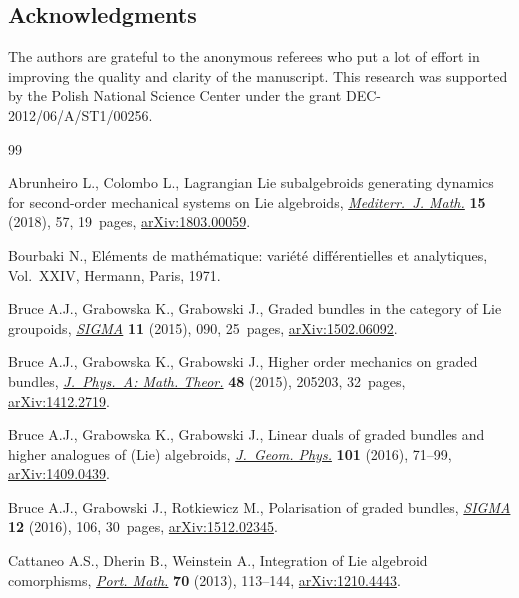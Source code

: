 \documentclass[pdftex]{sigma}
\numberwithin{equation}{section}
\theoremstyle{definition}
\begin{document}
\subsection*{Acknowledgments}
The authors are grateful to the anonymous referees who put a lot of effort in improving the quality and clarity of the manuscript. This research was supported by the Polish National Science Center under the grant DEC-2012/06/A/ST1/00256.

\begin{thebibliography}{99}
\footnotesize\itemsep=0pt

Abrunheiro L., Colombo L., Lagrangian {L}ie subalgebroids generating dynamics
 for second-order mechanical systems on {L}ie algebroids, \href{https://doi.org/10.1007/s00009-018-1108-x}{\textit{Mediterr.~J.
 Math.}} \textbf{15} (2018), 57, 19~pages, \href{https://arxiv.org/abs/1803.00059}{arXiv:1803.00059}.

Bourbaki N., El\'ements de math\'ematique: vari\'et\'e diff\'erentielles et
 analytiques, Vol.~XXIV, Hermann, Paris, 1971.

Bruce A.J., Grabowska K., Grabowski J., Graded bundles in the category of {L}ie
 groupoids, \href{https://doi.org/10.3842/SIGMA.2015.090}{\textit{SIGMA}} \textbf{11} (2015), 090, 25~pages,
 \href{https://arxiv.org/abs/1502.06092}{arXiv:1502.06092}.

Bruce A.J., Grabowska K., Grabowski J., Higher order mechanics on graded
 bundles, \href{https://doi.org/10.1088/1751-8113/48/20/205203}{\textit{J.~Phys.~A: Math. Theor.}} \textbf{48} (2015), 205203,
 32~pages, \href{https://arxiv.org/abs/1412.2719}{arXiv:1412.2719}.

Bruce A.J., Grabowska K., Grabowski J., Linear duals of graded bundles and
 higher analogues of ({L}ie) algebroids, \href{https://doi.org/10.1016/j.geomphys.2015.12.004}{\textit{J.~Geom. Phys.}} \textbf{101}
 (2016), 71--99, \href{https://arxiv.org/abs/1409.0439}{arXiv:1409.0439}.

Bruce A.J., Grabowski J., Rotkiewicz M., Polarisation of graded bundles,
 \href{https://doi.org/10.3842/SIGMA.2016.106}{\textit{SIGMA}} \textbf{12} (2016), 106, 30~pages, \href{https://arxiv.org/abs/1512.02345}{arXiv:1512.02345}.

Cattaneo A.S., Dherin B., Weinstein A., Integration of {L}ie algebroid
 comorphisms, \href{https://doi.org/10.4171/PM/1928}{\textit{Port. Math.}} \textbf{70} (2013), 113--144,
 \href{https://arxiv.org/abs/1210.4443}{arXiv:1210.4443}.


\end{thebibliography}
\end{document}
